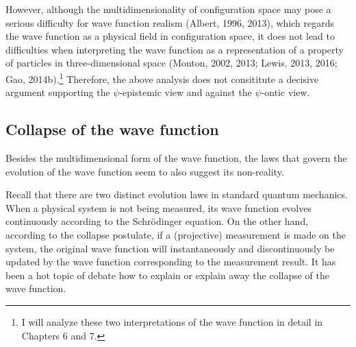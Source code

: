 However, although the multidimensionality of configuration space may pose a serious difficulty for wave function realism (Albert, 1996, 2013), which regards the wave function as a physical field in configuration space, it does not lead to difficulties when interpreting the wave function as a representation of a property of particles in three-dimensional space (Monton, 2002, 2013; Lewis, 2013, 2016; Gao, 2014b).\footnote{I will analyze these two interpretations of the wave function in detail in Chapters 6 and 7.} Therefore, the above analysis does not consititute a decisive argument supporting the $\psi$-epistemic view and against the $\psi$-ontic view. 

\subsection{Collapse of the wave function}

Besides the multidimensional form of the wave function, the laws that govern the evolution of the wave function seem to also suggest its non-reality. 

Recall that there are two distinct evolution laws in standard quantum mechanics. When a physical system is not being measured, its wave function evolves continuously according to the Schr\"{o}dinger equation. On the other hand, according to the collapse postulate, if a (projective) measurement is made on the system, the original wave function will instantaneously and discontinuously be updated by the wave function corresponding to the measurement result. It has been a hot topic of debate how to explain or explain away the collapse of the wave function. 

